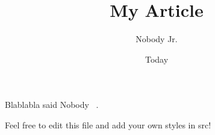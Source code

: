 \documentclass[11pt]{article}
\begin{document}
\title{My Article}
\author{Nobody Jr.}
\date{Today}
\maketitle

Blablabla said Nobody ~\cite{Nobody06}.

Feel free to edit this file and add your own styles in src!

{}

\end{document}
